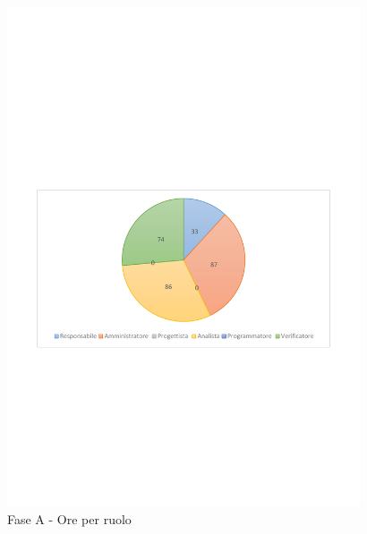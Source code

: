 \documentclass[../PianoProgetto.tex]{subfiles}
\begin{document}
\vfill	
	\begin{figure}[!h]
		\centering
		\includegraphics[width=0.93\textwidth , trim=2cm 9.5cm 2cm 11cm]{grafici/A/A-ore-ruolo}
			\caption{Fase A - Ore per ruolo}
		\label{fig:CircleChart-faseA_ore_r}
	\end{figure}
\vfill	
\newpage
\vfill	
\end{document}
